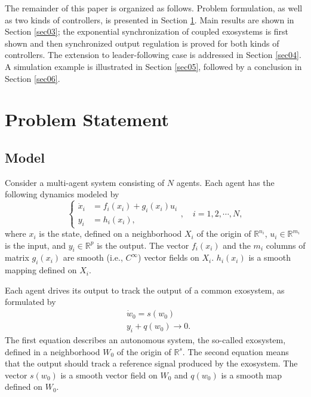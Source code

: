 \documentclass[onecolumn,a4paper,12pt]{article}
\newcommand{\real}{\mathbb{R}}
\numberwithin{equation}{section}
\begin{document}
The remainder of this paper is organized as follows. Problem formulation, as well as
two kinds of controllers, is presented in Section \ref{sec02}. Main results are shown in Section \ref{sec03}; the
exponential synchronization of coupled exosystems is first shown and then synchronized
output regulation is proved for both kinds of controllers. The extension to leader-following
case is addressed in Section \ref{sec04}. A simulation example is illustrated in Section \ref{sec05}, followed by
a conclusion in Section \ref{sec06}.



\section{Problem Statement} \label{sec02}
\subsection{Model}
Consider a multi-agent system consisting of $N$ agents. Each agent has the following dynamics modeled by
\begin{equation}   \label{II01}
\left\{\begin{split}
\dot{x}_i &= f_i(x_i)+g_i(x_i)u_i  \\
y_i & = h_i(x_i),
\end{split}\right., \quad  i=1,2,\cdots,N,
\end{equation}
where $x_i$ is the state, defined on a neighborhood $X_i$ of the origin of $\real^{n_i}$, $u_i\in\real^{m_i}$ is the input, and $y_i\in\real^p$ is the output. The vector $f_i(x_i)$ and the $m_i$ columns of matrix $g_i(x_i)$ are smooth (i.e., $C^{\infty}$) vector fields on $X_i$. $h_i(x_i)$ is a smooth mapping defined on $X_i$.

Each agent drives its output to track the output of a common exosystem, as formulated by
\begin{subequations}
\begin{align}
 &\dot{w}_0=s(w_0)\\
 &y_i+q(w_0)\rightarrow 0.
 \end{align}
\end{subequations}
The first equation describes an autonomous system, the so-called exosystem, defined in a neighborhood $W_0$ of the origin of $\real^s$. The second equation means that the output should track a reference signal produced by the exosystem. The vector $s(w_0)$ is a smooth vector field on $W_0$ and $q(w_0)$ is a smooth map defined on $W_0$.
\end{document}
